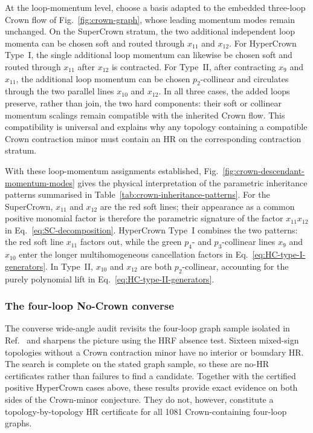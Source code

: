 \documentclass[a4paper,11pt]{article}
\begin{document}
At the loop-momentum level, choose a basis adapted to the embedded three-loop
Crown flow of Fig.~\ref{fig:crown-graph}, whose leading momentum modes remain
unchanged.  On the SuperCrown stratum, the two additional independent loop
momenta can be chosen soft and routed through \(x_{11}\) and \(x_{12}\).  For
HyperCrown Type~I, the single additional loop momentum can likewise be chosen
soft and routed through \(x_{11}\) after \(x_{12}\) is contracted.  For
Type~II, after contracting \(x_9\) and \(x_{11}\), the additional loop momentum
can be chosen \(p_2\)-collinear and circulates through the two parallel lines
\(x_{10}\) and \(x_{12}\).  In all three cases, the added loops preserve,
rather than join, the two hard components: their soft or collinear momentum
scalings remain compatible with the inherited Crown flow.  This compatibility
is universal and explains why any topology containing a compatible Crown
contraction minor must contain an HR on the corresponding
contraction stratum.

With these loop-momentum assignments established,
Fig.~\ref{fig:crown-descendant-momentum-modes} gives the physical
interpretation of the parametric inheritance patterns summarised in
Table~\ref{tab:crown-inheritance-patterns}.
For the SuperCrown, \(x_{11}\) and \(x_{12}\) are the red soft lines; their
appearance as a common positive monomial factor is therefore the parametric
signature of the factor \(x_{11}x_{12}\) in
Eq.~\eqref{eq:SC-decomposition}.  HyperCrown Type~I combines the two patterns:
the red soft line \(x_{11}\) factors out, while the green \(p_4\)- and
\(p_3\)-collinear lines \(x_9\) and \(x_{10}\) enter the longer
multihomogeneous cancellation factors in
Eq.~\eqref{eq:HC-type-I-generators}.  In Type~II, \(x_{10}\) and \(x_{12}\)
are both \(p_2\)-collinear, accounting for the purely polynomial lift in
Eq.~\eqref{eq:HC-type-II-generators}.

\subsubsection{The four-loop No-Crown converse}
\label{sec:no-crown-wide-angle}

The converse wide-angle audit revisits the four-loop graph sample isolated in
Ref.~\cite{Gardi:2024axt} and sharpens the picture using the HRF absence
test.  Sixteen
mixed-sign topologies without a Crown contraction minor have
no interior or boundary HR.  The search is complete on the stated graph sample,
so these are
no-HR certificates rather than failures to find a candidate.  Together with
the certified positive HyperCrown cases above, these results provide exact
evidence on both sides of the Crown-minor conjecture.  They do not, however,
constitute a topology-by-topology HR certificate for all 1081
Crown-containing four-loop graphs.
\end{document}
